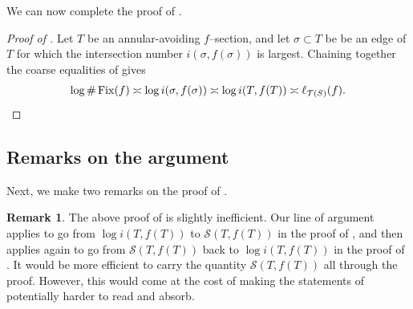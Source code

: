 \documentclass[11pt,letterpaper]{amsart}
\newcommand{\mc}{\mathcal}
\newcommand{\teich}{\mathcal T}
\newcommand{\Fix}{\operatorname{Fix}}
\numberwithin{equation}{section}
\theoremstyle{definition}
\newtheorem{remark}[theorem]{Remark}
\begin{document}
We can now complete the proof of  .

\begin{proof}[Proof of ]
Let $T$ be an annular-avoiding $f$--section, and let $\sigma \subset T$ be be an edge of $T$ for which the intersection number $i(\sigma, f(\sigma))$ is largest. 
Chaining together the coarse equalities of  gives
\[
\log \# \Fix(f) \asymp \log i(\sigma, f(\sigma))  \asymp  \log i(T, f(T))  \asymp \ell_{\teich(S)}(f).
\qedhere
\]
%    
\end{proof}



\subsection{Remarks on the argument}
Next, we make two remarks on the proof of  .


\begin{remark}\label{Rem:BacktrackingProof}
The above proof of  is slightly inefficient. Our line of argument applies   to go from $\log i(T, f(T))$ to $\mc S(T, f(T))$ in the proof of , and then applies    again to go from $\mc S(T, f(T))$ back to $\log i(T, f(T))$ in the proof of . It would be more efficient to carry the quantity $\mc S(T, f(T))$ all through the proof. However, this would come at the cost of making the statements of  potentially harder to read and absorb.
\end{remark}
\end{document}
